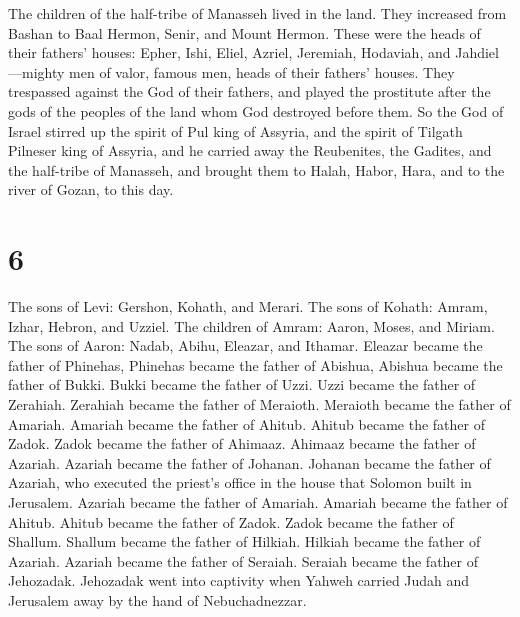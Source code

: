  The children of the half-tribe of Manasseh lived in the
land. They increased from Bashan to Baal Hermon, Senir, and Mount
Hermon.  These were the heads of their fathers' houses:
Epher, Ishi, Eliel, Azriel, Jeremiah, Hodaviah, and Jahdiel---mighty men
of valor, famous men, heads of their fathers' houses.  They
trespassed against the God of their fathers, and played the prostitute
after the gods of the peoples of the land whom God destroyed before
them.  So the God of Israel stirred up the spirit of Pul
king of Assyria, and the spirit of Tilgath Pilneser king of Assyria, and
he carried away the Reubenites, the Gadites, and the half-tribe of
Manasseh, and brought them to Halah, Habor, Hara, and to the river of
Gozan, to this day.

\hypertarget{section-5}{%
\section{6}\label{section-5}}

 The sons of Levi: Gershon, Kohath, and Merari. 
The sons of Kohath: Amram, Izhar, Hebron, and Uzziel.  The
children of Amram: Aaron, Moses, and Miriam. The sons of Aaron: Nadab,
Abihu, Eleazar, and Ithamar.  Eleazar became the father of
Phinehas, Phinehas became the father of Abishua,  Abishua
became the father of Bukki. Bukki became the father of Uzzi.
 Uzzi became the father of Zerahiah. Zerahiah became the
father of Meraioth.  Meraioth became the father of Amariah.
Amariah became the father of Ahitub.  Ahitub became the
father of Zadok. Zadok became the father of Ahimaaz. 
Ahimaaz became the father of Azariah. Azariah became the father of
Johanan.  Johanan became the father of Azariah, who
executed the priest's office in the house that Solomon built in
Jerusalem.  Azariah became the father of Amariah. Amariah
became the father of Ahitub.  Ahitub became the father of
Zadok. Zadok became the father of Shallum.  Shallum became
the father of Hilkiah. Hilkiah became the father of Azariah.
 Azariah became the father of Seraiah. Seraiah became the
father of Jehozadak.  Jehozadak went into captivity when
Yahweh carried Judah and Jerusalem away by the hand of Nebuchadnezzar.


